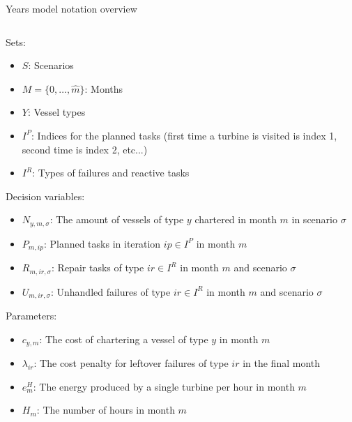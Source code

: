 \documentclass{beamer}
\newcommand{\smalld}{\tiny}
\begin{document}
\begin{frame}{Years model notation overview}
\smalld
\begin{columns}
\begin{column}{.48\textwidth}
Sets:
\begin{itemize}
\item $S$: Scenarios
\item $M = \{0 , \dots , \hat{m}\}$: Months
\item $Y$: Vessel types
\item $I^P$: Indices for the planned tasks (first time a turbine is visited is index 1, second time is index 2, etc...)
\item $I^R$: Types of failures and reactive tasks
\end{itemize}

Decision variables:
\begin{itemize}
\item $N_{y,m,\sigma}$: The amount of vessels of type $y$ chartered in month $m$ in scenario $\sigma$
\item $P_{m,ip}$: Planned tasks in iteration $ip \in I^P$ in month $m$
\item $R_{m,ir,\sigma}$: Repair tasks of type $ir \in I^R$ in month $m$ and scenario $\sigma$
\item $U_{m,ir,\sigma}$: Unhandled failures of type $ir \in I^R$ in month $m$ and scenario $\sigma$
\end{itemize}

Parameters:
\begin{itemize}
\item $c_{y,m}$: The cost of chartering a vessel of type $y$ in month $m$
\item $\lambda_{ir}$: The cost penalty for leftover failures of type $ir$ in the final month
\item $e^H_m$: The energy produced by a single turbine per hour in month $m$
\item $H_m$: The number of hours in month $m$
\end{itemize}
\end{column}

\hfill


\end{columns}
\end{frame}
\end{document}
